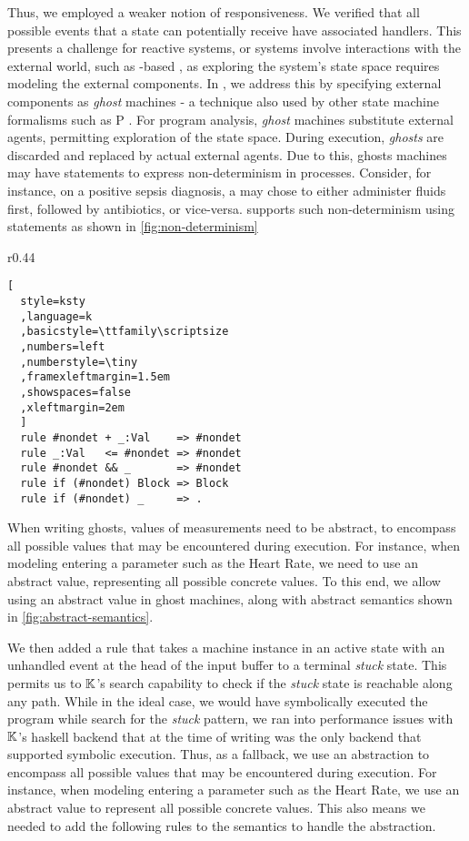Thus, we employed a weaker notion of responsiveness. We verified that all
possible events that a state can potentially receive have associated handlers.
 This presents a challenge for reactive systems, or systems involve interactions
with the external world, such as \MediK{}-based \CDSSs, as exploring
the system's state space requires modeling the external components.
In \MediK{}, we address this by specifying external components
as \emph{ghost} machines - a technique also used by other state machine
formalisms such as P \cite{DesaiPLDI13}.
For program analysis, \emph{ghost} machines substitute external agents,
permitting exploration of the state space.
During execution, \emph{ghosts} are discarded and replaced by actual external agents.
Due to this, ghosts machines may have statements to express non-determinism
in processes. Consider, for instance, on a positive sepsis diagnosis, a
\HCP{} may chose to either administer fluids first, followed by antibiotics, or
vice-versa. \MediK{} supports such non-determinism using 
statements as shown in \figurename{} \ref{fig:non-determinism}

\begin{wrapfigure}{r}{0.44\textwidth}
\begin{lstlisting}[
  style=ksty
  ,language=k
  ,basicstyle=\ttfamily\scriptsize
  ,numbers=left
  ,numberstyle=\tiny
  ,framexleftmargin=1.5em
  ,showspaces=false
  ,xleftmargin=2em
  ]
  rule #nondet + _:Val    => #nondet
  rule _:Val   <= #nondet => #nondet
  rule #nondet && _       => #nondet
  rule if (#nondet) Block => Block
  rule if (#nondet) _     => .
\end{lstlisting}
  \caption{Abstract Semantics}\label{fig:abstract-semantics}
\end{wrapfigure}

When writing ghosts, values of measurements need to be abstract, to
encompass all possible values that may be encountered during execution.
For instance, when modeling entering a parameter such as the Heart Rate,
we need to use an abstract value, representing all possible concrete values.
To this end, we allow using an abstract value  in ghost machines,
along with abstract semantics shown in \figurename{} \ref{fig:abstract-semantics}.

We then added a rule that takes a machine instance in an active state
with an unhandled event at the head of the input buffer to a terminal \emph{stuck}
state. This permits us to $\mathbb{K}$'s search capability to check if the \emph{stuck}
state is reachable along any path.
While in the ideal case, we would have symbolically executed the program while
search for the \emph{stuck} pattern, we ran into performance issues
with $\mathbb{K}$'s haskell backend that at the time of writing was the only backend
that supported symbolic execution. Thus, as a fallback, we
use an abstraction to
encompass all possible values that may be encountered during execution.
For instance, when modeling entering a parameter such as the Heart Rate,
we use an abstract value to represent all possible concrete values.
This also means we needed to add the following rules to the semantics to
handle the abstraction.


